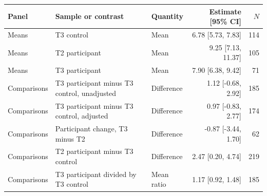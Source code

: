 
\begin{tabular}{lllrr}
\toprule
Panel & Sample or contrast & Quantity & Estimate [95\% CI] & $N$\\
\midrule
Means & T3 control & Mean & 6.78 [5.73, 7.83] & 114\\
Means & T2 participant & Mean & 9.25 [7.13, 11.37] & 105\\
Means & T3 participant & Mean & 7.90 [6.38, 9.42] & 71\\
Comparisons & T3 participant minus T3 control, unadjusted & Difference & 1.12 [-0.68, 2.92] & 185\\
Comparisons & T3 participant minus T3 control, adjusted & Difference & 0.97 [-0.83, 2.77] & 174\\
Comparisons & Participant change, T3 minus T2 & Difference & -0.87 [-3.44, 1.70] & 62\\
Comparisons & T2 participant minus T3 control & Difference & 2.47 [0.20, 4.74] & 219\\
Comparisons & T3 participant divided by T3 control & Mean ratio & 1.17 [0.92, 1.48] & 185\\
\bottomrule
\end{tabular}
